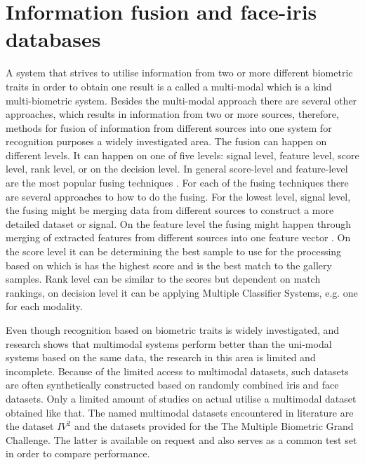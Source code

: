\section{Information fusion and face-iris databases}

A system that strives to utilise information from two or more different biometric traits in order to obtain one result is a called a multi-modal which is a kind multi-biometric system. Besides the multi-modal approach there are several other approaches, which results in information from two or more sources, therefore, methods for fusion of information from different sources into one system for recognition purposes a widely investigated area.  The fusion can happen on different levels. It can happen on one of five levels: signal level, feature level, score level, rank level, or on the decision level. In general score-level and feature-level are the most popular fusing techniques \citep{Bowyer2016b}. For each of the fusing techniques there are several approaches to how to do the fusing. For the lowest level, signal level, the fusing might be merging data from different sources to construct a more detailed dataset or signal. On the feature level the fusing might happen through merging of extracted features from different sources into one feature vector \citep{Ross2003}. On the score level it can be determining the best sample to use for the processing based on which is has the highest score and is the best match to the gallery samples. Rank level can be similar to the scores but dependent on match rankings, on decision level it can be applying Multiple Classifier Systems, e.g. one for each modality\citep{Fierrez2018b}.

Even though recognition based on biometric traits is widely investigated, and research shows that multimodal systems perform better than the uni-modal systems based on the same data, the research in this area is limited and incomplete. Because of the limited access to multimodal datasets, such datasets are often synthetically constructed based on randomly combined iris and face datasets. Only a limited amount of studies on actual utilise a multimodal dataset obtained like that. The named multimodal datasets encountered in literature are the dataset $IV^2$ and the datasets provided for the The Multiple Biometric Grand Challenge\citep{Bowyer2016b,Petrovska-Delacretaz2008a}. The latter is available on request and also serves as a common test set in order to compare performance.  